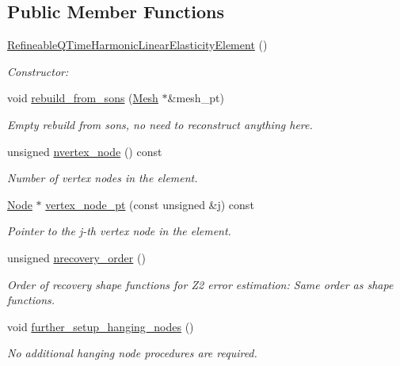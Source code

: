 \subsection*{Public Member Functions}
\begin{DoxyCompactItemize}
\item 
\hyperlink{classoomph_1_1RefineableQTimeHarmonicLinearElasticityElement_a4c3afda74d46ce399fc5929a5315b8b2}{Refineable\+Q\+Time\+Harmonic\+Linear\+Elasticity\+Element} ()
\begin{DoxyCompactList}\small\item\em Constructor\+: \end{DoxyCompactList}\item 
void \hyperlink{classoomph_1_1RefineableQTimeHarmonicLinearElasticityElement_ab7ae9c5375153806dbc28f38ad5b06f4}{rebuild\+\_\+from\+\_\+sons} (\hyperlink{classoomph_1_1Mesh}{Mesh} $\ast$\&mesh\+\_\+pt)
\begin{DoxyCompactList}\small\item\em Empty rebuild from sons, no need to reconstruct anything here. \end{DoxyCompactList}\item 
unsigned \hyperlink{classoomph_1_1RefineableQTimeHarmonicLinearElasticityElement_a7da8b42083b1b6d0d8d3cf8ad04c8599}{nvertex\+\_\+node} () const
\begin{DoxyCompactList}\small\item\em Number of vertex nodes in the element. \end{DoxyCompactList}\item 
\hyperlink{classoomph_1_1Node}{Node} $\ast$ \hyperlink{classoomph_1_1RefineableQTimeHarmonicLinearElasticityElement_ab78845396d1b78ba751e2feb2bf2c8a9}{vertex\+\_\+node\+\_\+pt} (const unsigned \&j) const
\begin{DoxyCompactList}\small\item\em Pointer to the j-\/th vertex node in the element. \end{DoxyCompactList}\item 
unsigned \hyperlink{classoomph_1_1RefineableQTimeHarmonicLinearElasticityElement_aafe64dce602c1e0f843a6882a8db1319}{nrecovery\+\_\+order} ()
\begin{DoxyCompactList}\small\item\em Order of recovery shape functions for Z2 error estimation\+: Same order as shape functions. \end{DoxyCompactList}\item 
void \hyperlink{classoomph_1_1RefineableQTimeHarmonicLinearElasticityElement_a498bb91cfc95d74f411634ab7a5dd065}{further\+\_\+setup\+\_\+hanging\+\_\+nodes} ()
\begin{DoxyCompactList}\small\item\em No additional hanging node procedures are required. \end{DoxyCompactList}\end{DoxyCompactItemize}
